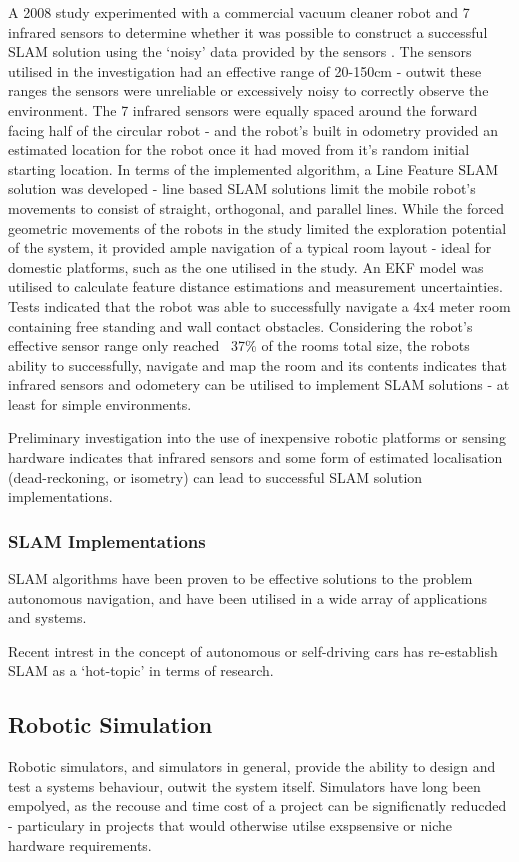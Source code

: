A 2008 study experimented with a commercial vacuum cleaner robot and 7 infrared
sensors to determine whether it was possible to construct a successful SLAM
solution using the `noisy' data provided by the sensors \cite{Choi2008}.
The sensors utilised in the investigation had an effective range of 20-150cm -
outwit these ranges the sensors were unreliable or excessively noisy to
correctly observe the environment.
The 7 infrared sensors were equally spaced around the forward facing half of
the circular robot - and the robot's built in odometry provided an estimated
location for the robot once it had moved from it's random initial starting
location.
In terms of the implemented algorithm, a  Line Feature SLAM solution was
developed - line based SLAM solutions limit the mobile robot's movements to
consist of straight, orthogonal, and parallel lines.
While the forced geometric movements of the robots in the study limited the
exploration potential of the system, it provided ample navigation of a typical
room layout - ideal for domestic platforms, such as the one utilised in the
study.
An EKF model was utilised to calculate feature distance estimations and
measurement uncertainties.
Tests indicated that the  robot was able to successfully navigate a 4x4 meter
room containing free standing and wall contact obstacles.
Considering the robot's effective sensor range only reached ~37\% of the rooms
total size, the robots ability to successfully, navigate and map the room and
its contents indicates that infrared sensors and odometery can be utilised to
implement SLAM solutions - at least for simple environments.

Preliminary investigation into the use of inexpensive robotic platforms or
sensing hardware indicates that infrared sensors and some form of estimated
localisation (dead-reckoning, or isometry) can lead to successful SLAM solution
implementations.


\subsubsection{SLAM Implementations}
SLAM algorithms have been proven to be effective solutions to the problem
autonomous navigation, and have been utilised in a wide array of applications
and systems.

Recent intrest in the concept of autonomous or self-driving cars has
re-establish SLAM as a `hot-topic' in terms of research.


\subsection{Robotic Simulation}
Robotic simulators, and simulators in general, provide the ability to design
and test a  systems behaviour, outwit the system itself. 
Simulators have long been empolyed, as the recouse and time cost of a project
can be significnatly reducded - particulary in projects that would otherwise
utilse exspsensive or niche hardware requirements.

